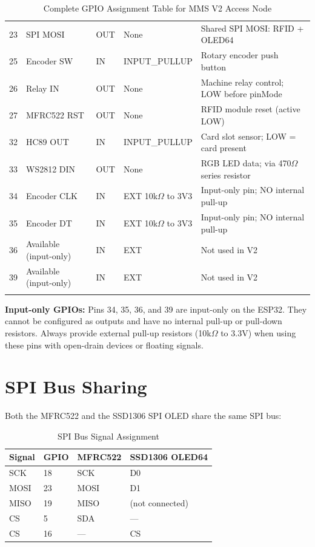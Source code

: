\begin{longtable}{C{2cm}L{4.5cm}C{2.5cm}L{3cm}L{3.5cm}}
23  & SPI MOSI           & OUT & None       & Shared SPI MOSI: RFID + OLED64 \\
25  & Encoder SW         & IN  & INPUT\_PULLUP & Rotary encoder push button \\
26  & Relay IN           & OUT & None       & Machine relay control; LOW before pinMode \\
27  & MFRC522 RST        & OUT & None       & RFID module reset (active LOW) \\
32  & HC89 OUT           & IN  & INPUT\_PULLUP & Card slot sensor; LOW = card present \\
33  & WS2812 DIN         & OUT & None       & RGB LED data; via 470$\Omega$ series resistor \\
34  & Encoder CLK        & IN  & EXT 10k$\Omega$ to 3V3 & Input-only pin; NO internal pull-up \\
35  & Encoder DT         & IN  & EXT 10k$\Omega$ to 3V3 & Input-only pin; NO internal pull-up \\
36  & Available (input-only) & IN & EXT & Not used in V2 \\
39  & Available (input-only) & IN & EXT & Not used in V2 \\
\bottomrule
\caption{Complete GPIO Assignment Table for MMS V2 Access Node}
\label{tab:gpio_full}
\end{longtable}

\begin{notebox}
\textbf{Input-only GPIOs:} Pins 34, 35, 36, and 39 are input-only on the ESP32. They cannot be configured as outputs and have no internal pull-up or pull-down resistors. Always provide external pull-up resistors (10k$\Omega$ to 3.3V) when using these pins with open-drain devices or floating signals.
\end{notebox}

\section{SPI Bus Sharing}

Both the MFRC522 and the SSD1306 SPI OLED share the same SPI bus:

\begin{table}[H]
\centering
\caption{SPI Bus Signal Assignment}
\begin{tabular}{L{3cm}C{2cm}C{3cm}C{3cm}}
\toprule
\textbf{Signal} & \textbf{GPIO} & \textbf{MFRC522} & \textbf{SSD1306 OLED64} \\
\midrule
SCK  & 18 & SCK  & D0 \\
MOSI & 23 & MOSI & D1 \\
MISO & 19 & MISO & (not connected) \\
CS   & 5  & SDA  & --- \\
CS   & 16 & ---  & CS \\
\bottomrule
\end{tabular}
\end{table}

